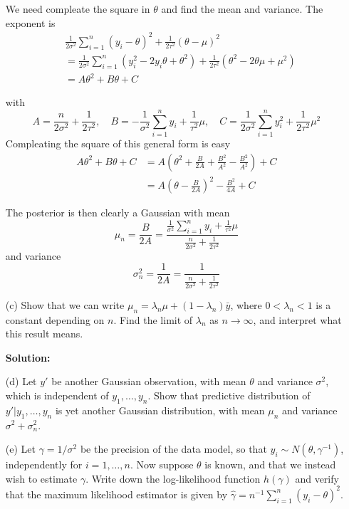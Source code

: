 \documentclass{article}
\begin{document}
\begin{enumerate}
    We need compleate the square in $\theta$ and find the mean and variance. The exponent is
    \begin{align*}
            &\frac{1}{2\sigma^2} \sum_{i=1}^n (y_i - \theta)^2 + \frac{1}{2\tau^2} (\theta - \mu)^2\\ 
            &= \frac{1}{2\sigma^2} \sum_{i=1}^n (y_i^2 - 2y_i\theta + \theta^2) + \frac{1}{2\tau^2} (\theta^2 - 2\theta\mu + \mu^2)\\
            &= A \theta^2 + B \theta + C
    \end{align*}

    with 
    \[
    A = \frac{n}{2\sigma^2}  + \frac{1}{2\tau^2}, \quad B = -\frac{1}{\sigma^2} \sum_{i=1}^n y_i + \frac{1}{\tau^2} \mu, \quad C = \frac{1}{2\sigma^2} \sum_{i=1}^n y_i^2 + \frac{1}{2\tau^2} \mu^2
    \]
    Compleating the square of this general form is easy
    \begin{align*}
        A \theta^2 + B \theta + C &= A \left(\theta^2 + \frac{B}{2A} + \frac{B^2}{A^2} - \frac{B^2}{A^2}\right) + C \\
        &= A \left(\theta - \frac{B}{2A}\right)^2 - \frac{B^2}{4A} + C
    \end{align*}

    The posterior is then clearly a Gaussian with mean
    \[
    \mu_n = \frac{B}{2A} = \frac{\frac{1}{\sigma^2} \sum_{i=1}^n y_i + \frac{1}{\tau^2} \mu}{\frac{n}{2\sigma^2}  + \frac{1}{2\tau^2}}
    \]
    and variance
    \[
    \sigma_n^2 = \frac{1}{2A} = \frac{1}{\frac{n}{2\sigma^2}  + \frac{1}{2\tau^2}}
    \]

    \item[(c)] Show that we can write $\mu_n = \lambda_n \mu + (1 - \lambda_n) \bar{y}$, where $0 < \lambda_n < 1$ is a constant depending on $n$. Find the limit of $\lambda_n$ as $n \to \infty$, and interpret what this result means.
    
    \textbf{Solution:}
    \par

    


    \item[(d)] Let $y'$ be another Gaussian observation, with mean $\theta$ and variance $\sigma^2$, which is independent of $y_1, \dots, y_n$. Show that predictive distribution of $y' | y_1, \dots, y_n$ is yet another Gaussian distribution, with mean $\mu_n$ and variance $\sigma^2 + \sigma_n^2$.
    
    \item[(e)] Let $\gamma = 1/\sigma^2$ be the precision of the data model, so that $y_i \sim N(\theta, \gamma^{-1})$, independently for $i = 1, \dots, n$. Now suppose $\theta$ is known, and that we instead wish to estimate $\gamma$. Write down the log-likelihood function $h(\gamma)$ and verify that the maximum likelihood estimator is given by $\hat{\gamma} = n^{-1} \sum_{i=1}^n (y_i - \theta)^2$.
    

\end{enumerate}
\end{document}
